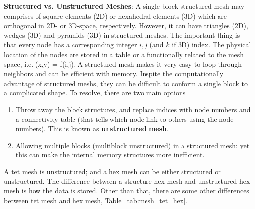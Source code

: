 \begin{framed}
{\bf Structured vs. Unstructured Meshes}: A single block structured mesh may
comprises of square elements (2D) or hexahedral elements (3D) which are
orthogonal in 2D- or 3D-space, respectively. However, it can have triangles
(2D), wedges (3D) and pyramids (3D) in structured meshes. The important thing is
that every node has a corresponding integer $i,j$ (and $k$ if 3D) index.  The
physical location of the nodes are stored in a table or a functionally related
to the mesh space, i.e. (x,y) = f(i,j). A structured mesh makes it very easy to
loop through neighbors and can be efficient with memory. Inspite the
computationally advantage of structured meshs, they can be difficult to conform
a single block to a complicated shape. To resolve, there are two main options

\begin{enumerate}
  \item Throw away the block structures, and replace indices with node numbers
  and a connectivity table (that tells which node link to others using the node
  numbers). This is known as {\bf unstructured mesh}.
  \item Allowing multiple blocks (multiblock unstructured) in a structured mesh;
  yet this can make the internal memory structures more inefficient.
\end{enumerate}

A tet mesh is unstructured; and a hex mesh can be either structured or
unstructured. The difference between a structure hex mesh and unstructured hex
mesh is how the data is stored. Other than that, there are some other
differences between tet mesh and hex mesh, Table~\ref{tab:mesh_tet_hex}.

\end{framed}

